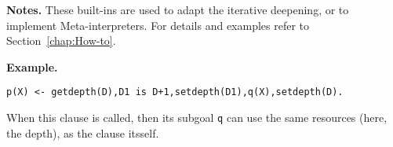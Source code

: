 \vspace*{0.5cm}
\noindent
{\bf Notes.}
These built-ins are used to adapt the iterative deepening, or to implement
Meta-interpreters. For details and examples refer to Section~\ref{chap:How-to}.

\vspace*{0.5cm}
\noindent
{\bf Example.}
\begin{verbatim}
p(X) <- getdepth(D),D1 is D+1,setdepth(D1),q(X),setdepth(D).
\end{verbatim}

When this clause is called, then its subgoal {\tt q} can use  the same
resources (here, the depth), as the clause itsself.

